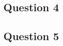 \documentclass[a4paper, 12pt]{article}
\begin{document}
\subsection*{Question 4}






\subsection*{Question 5}

\end{document}
